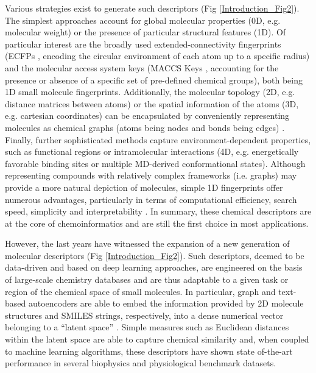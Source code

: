 Various strategies exist to generate such descriptors (Fig \ref{Introduction_Fig2}). The simplest approaches account for global molecular properties (0D, e.g. molecular weight) or the presence of particular structural features (1D). Of particular interest are the broadly used extended-connectivity fingerprints (ECFPs \cite{rogers_extended-connectivity_2010}, encoding the circular environment of each atom up to a specific radius) and the molecular access system keys (MACCS Keys \cite{durant_reoptimization_2002}, accounting for the presence or absence of a specific set of pre-defined chemical groups), both being 1D small molecule fingerprints. Additionally, the molecular topology (2D, e.g. distance matrices between atoms) or the spatial information of the atoms (3D, e.g. cartesian coordinates) can be encapsulated by conveniently representing molecules as chemical graphs (atoms being nodes and bonds being edges) \cite{devinyak_3d-morse_2014}. Finally, further sophisticated methods capture environment-dependent properties, such as functional regions or intramolecular interactions (4D, e.g. energetically favorable binding sites or multiple MD-derived conformational states)\cite{pastor_grid-independent_2000, riniker_molecular_2017}. Although representing compounds with relatively complex frameworks (i.e. graphs) may provide a more natural depiction of molecules, simple 1D fingerprints offer numerous advantages, particularly in terms of computational efficiency, search speed, simplicity and interpretability \cite{rogers_extended-connectivity_2010}. In summary, these chemical descriptors are at the core of chemoinformatics and are still the first choice in most applications\cite{david_molecular_2020, cereto-massague_molecular_2015}.

However, the last years have witnessed the expansion of a new generation of molecular descriptors (Fig \ref{Introduction_Fig2}). Such descriptors, deemed to be data-driven and based on deep learning approaches, are engineered on the basis of large-scale chemistry databases and are thus adaptable to a given task or region of the chemical space of small molecules\cite{sanchez-lengeling_inverse_2018}. In particular, graph and text-based autoencoders\cite{hinton_reducing_2006, baldi_autoencoders_2012} are able to embed the information provided by 2D molecule structures and SMILES strings, respectively, into a dense numerical vector belonging to a “latent space” \cite{jin_hierarchical_2019, gomez-bombarelli_automatic_2018, liu_constrained_2018, polykovskiy_molecular_2020}. Simple measures such as Euclidean distances within the latent space are able to capture chemical similarity and, when coupled to machine learning algorithms, these descriptors have shown state of-the-art performance in several biophysics and physiological benchmark datasets\cite{wu_moleculenet_2018}.

